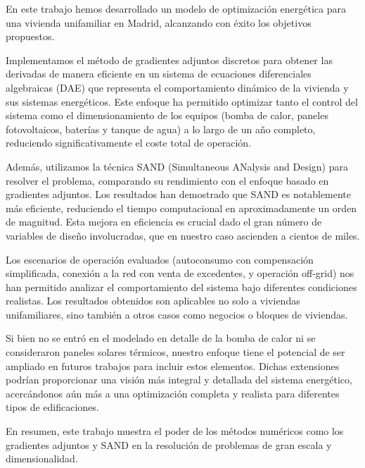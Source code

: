 En este trabajo hemos desarrollado un modelo de optimización energética para
una vivienda unifamiliar en Madrid, alcanzando con éxito los objetivos
propuestos.

Implementamos el método de gradientes adjuntos discretos para obtener las
derivadas de manera eficiente en un sistema de ecuaciones diferenciales
algebraicas (DAE) que representa el comportamiento dinámico de la vivienda y
sus sistemas energéticos. Este enfoque ha permitido optimizar tanto el control
del sistema como el dimensionamiento de los equipos (bomba de calor, paneles
fotovoltaicos, baterías y tanque de agua) a lo largo de un año completo,
reduciendo significativamente el coste total de operación.

Además, utilizamos la técnica SAND (Simultaneous ANalysis and Design) para
resolver el problema, comparando su rendimiento con el enfoque basado en
gradientes adjuntos. Los resultados han demostrado que SAND es notablemente más
eficiente, reduciendo el tiempo computacional en aproximadamente un orden de
magnitud. Esta mejora en eficiencia es crucial dado el gran número de variables
de diseño involucradas, que en nuestro caso ascienden a cientos de miles.

Los escenarios de operación evaluados (autoconsumo con compensación
simplificada, conexión a la red con venta de excedentes, y operación off-grid)
nos han permitido analizar el comportamiento del sistema bajo diferentes
condiciones realistas. Los resultados obtenidos son aplicables no solo a
viviendas unifamiliares, sino también a otros casos como negocios o bloques de
viviendas.

Si bien no se entró en el modelado en detalle de la bomba de calor ni se
consideraron paneles solares térmicos, nuestro enfoque tiene el potencial de
ser ampliado en futuros trabajos para incluir estos elementos. Dichas
extensiones podrían proporcionar una visión más integral y detallada del
sistema energético, acercándonos aún más a una optimización completa y realista
para diferentes tipos de edificaciones.

En resumen, este trabajo muestra el poder de los métodos numéricos como los
gradientes adjuntos y SAND en la resolución de problemas de gran escala y
dimensionalidad.
